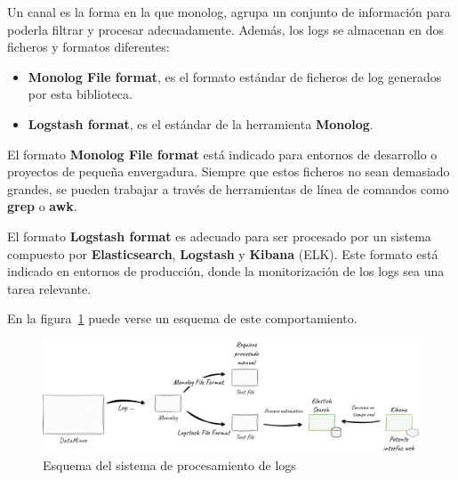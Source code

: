 Un canal es la forma en la que monolog, agrupa un conjunto de información para poderla filtrar y procesar adecuadamente.
Además, los logs se almacenan en dos ficheros y formatos diferentes:

\begin{itemize}
    \item \textbf{Monolog File format}, es el formato estándar de ficheros de log generados por esta biblioteca.
    \item \textbf{Logstash format}, es el estándar de la herramienta \textbf{Monolog}.
\end{itemize}

El formato \textbf{Monolog File format} está indicado para entornos de desarrollo o proyectos de pequeña envergadura.
Siempre que estos ficheros no sean demasiado grandes, se pueden trabajar a través de herramientas de línea de comandos
como \textbf{grep} o \textbf{awk}.

El formato \textbf{Logstash format} es adecuado para ser procesado por un sistema compuesto por
\textbf{Elasticsearch}, \textbf{Logstash} y \textbf{Kibana} (ELK).
Este formato está indicado en entornos de producción, donde la monitorización de los logs sea una tarea relevante.

En la figura~\ref{fig:chapter_4.4.logs_overview} puede verse un esquema de este comportamiento.

\begin{figure}[ht]
    \begin{center}
        \includegraphics[width=\textwidth]{./chapter/4/images/chapter_4.4.logs_overview}
        \caption{Esquema del sistema de procesamiento de logs}
        \label{fig:chapter_4.4.logs_overview}
    \end{center}
\end{figure}